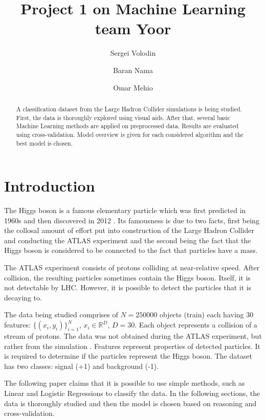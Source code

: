 \documentclass[10pt,conference,compsocconf]{IEEEtran}
\title{Project 1 on Machine Learning team Yoor}
\author[1]{Sergei Volodin}
\author[1]{Baran Nama}
\author[1]{Omar Mehio}
\affil[1]{EPFL}
\affil[ ]{\textit {\{sergei.volodin,baran.nama,omar.mehio\}@epfl.ch}}
\begin{document}
\maketitle

\begin{abstract}
A classification dataset from the Large Hadron Collider simulations is being studied. First, the data is thoroughly explored using visual aids.
After that, several basic Machine Learning methods are applied on preprocessed data.
Results are evaluated using cross-validation.
Model overview is given for each considered algorithm and the best model is chosen.
\end{abstract}

\section{Introduction}
The Higgs boson is a famous elementary particle which was first predicted in 1960s and then discovered in 2012 \cite{higgs}. Its famousness is due to two facts, first being the collosal amount of effort put into construction of the Large Hadron Collider and conducting the ATLAS experiment and the second being the fact that the Higgs boson is considered to be connected to the fact that particles have a mass.

The ATLAS experiment consists of protons colliding at near-relative speed. After collision, the resulting particles sometimes contain the Higgs boson. Itself, it is not detectable by LHC. However, it is possible to detect the particles that it is decaying to.

The data being studied comprises of $N=250 000$ objects (train) each having 30 features: $\{(x_i,y_i)\}_{i=1}^N$, $x_i\in\mathbb{R}^D$, $D=30$. Each object represents a collision of a stream of protons. The data was not obtained during the ATLAS experiment, but rather from the simulation \cite{data}. Features represent properties of detected particles. It is required to determine if the particles represent the Higgs boson. The dataset has two classes: signal (+1) and background (-1).

The following paper claims that it is possible to use simple methods, such as Linear and Logistic Regressions to classify the data. In the following sections, the data is thoroughly studied and then the model is chosen based on reasoning and cross-validation.
\end{document}
